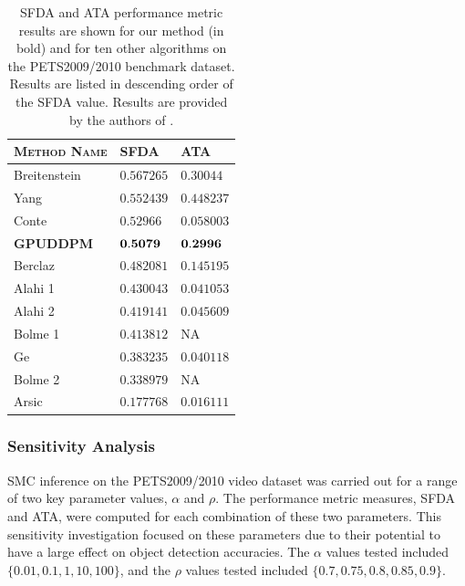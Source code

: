\documentclass[twocolumn, final]{svjour3}
\begin{document}
\begin{table}
\begin{tabular}[!] {| l | l | l |}
  \hline
  \textsc{Method Name} & \textsc{SFDA}  & \textsc{ATA} \\ \hline \hline
  Breitenstein \cite{breitenstein2009markovian} & $ 0.567265 $ & $0.30044$ \\ \hline
  Yang \cite{yang2009probabilistic} & $ 0.552439 $ & $0.448237$ \\ \hline
  Conte \cite{conte2010performance} & $ 0.52966  $ & $0.058003$ \\ \hline
  \textbf{GPUDDPM} & $ \bold{0.5079} $ & $\bold{0.2996}$ \\ \hline
  Berclaz \cite{berclaz2009multiple} & $ 0.482081 $ & $0.145195$ \\ \hline
  Alahi 1 \cite{alahi2009sparsity} & $ 0.430043 $ & $0.041053$ \\ \hline
  Alahi 2 \cite{alahi2009sparsity} & $ 0.419141 $ & $0.045609$ \\ \hline
  Bolme 1 \cite{bolme2009simple} & $ 0.413812 $ & NA \\ \hline
  Ge \cite{ge2009evaluation} & $ 0.383235 $ & $0.040118$ \\ \hline
  Bolme 2 \cite{bolme2009simple} & $ 0.338979 $ & NA \\ \hline
  Arsic \cite{arsic2009multi} & $ 0.177768 $ & $0.016111$ \\
  \hline
\end{tabular}
\caption{SFDA and ATA performance metric results are shown for our method (in bold) and for ten other algorithms on the PETS2009/2010 benchmark dataset. Results are listed in descending order of the SFDA value. Results are provided by the authors of \cite{ellis_2010}.}
\label{benchmark_results_table}
\end{table}



\subsubsection{Sensitivity Analysis}
\label{sec:sensitivityanalysis}

SMC inference on the PETS2009/2010 video dataset was carried out for a range of two key parameter values, $\alpha$ and $\rho$. The performance metric measures, SFDA and ATA, were computed for each combination of these two parameters. This sensitivity investigation focused on these parameters due to their potential to have a large effect on object detection accuracies. The $\alpha$ values tested included $\{ 0.01, 0.1, 1, 10, 100 \}$, and the $\rho$ values tested included $\{ 0.7, 0.75, 0.8, 0.85, 0.9 \}$.
\end{document}
